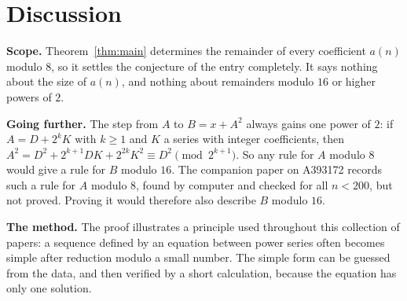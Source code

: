 \documentclass[11pt,a4paper]{article}
\theoremstyle{definition}
\theoremstyle{remark}
\newcommand{\para}[1]{\par\medskip\noindent\textbf{#1}\enspace}
\begin{document}
\section{Discussion}\label{sec:discussion}

\para{Scope.} Theorem~\ref{thm:main} determines the remainder of every coefficient $a(n)$ modulo $8$, so it settles the
conjecture of the entry completely. It says nothing about the size of $a(n)$, and nothing about remainders modulo $16$
or higher powers of $2$.

\para{Going further.} The step from $A$ to $B=x+A^2$ always gains one power of $2$: if $A=D+2^kK$ with $k\ge1$ and $K$ a
series with integer coefficients, then $A^2=D^2+2^{k+1}DK+2^{2k}K^2\equiv D^2\pmod{2^{k+1}}$. So any rule for $A$ modulo
$8$ would give a rule for $B$ modulo $16$. The companion paper on A393172 records such a rule for $A$ modulo $8$, found
by computer and checked for all $n<200$, but not proved. Proving it would therefore also describe $B$ modulo $16$.

\para{The method.} The proof illustrates a principle used throughout this collection of papers: a sequence defined by
an equation between power series often becomes simple after reduction modulo a small number. The simple form can be
guessed from the data, and then verified by a short calculation, because the equation has only one solution.
\end{document}

